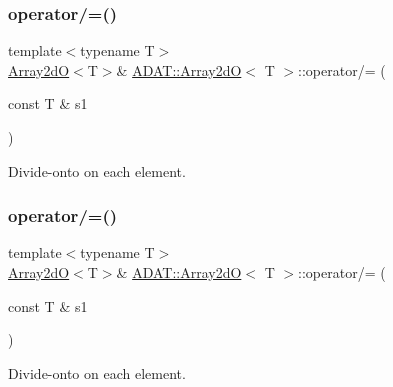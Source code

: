\subsubsection{\texorpdfstring{operator/=()}{operator/=()}\hspace{0.1cm}{\footnotesize\ttfamily [5/6]}}
{\footnotesize\ttfamily template$<$typename T$>$ \\
\mbox{\hyperlink{classADAT_1_1Array2dO}{Array2dO}}$<$T$>$\& \mbox{\hyperlink{classADAT_1_1Array2dO}{A\+D\+A\+T\+::\+Array2dO}}$<$ T $>$\+::operator/= (\begin{DoxyParamCaption}\item[{const T \&}]{s1 }\end{DoxyParamCaption})\hspace{0.3cm}{\ttfamily [inline]}}



Divide-\/onto on each element. 

\mbox{\label{classADAT_1_1Array2dO_ae0c954c51dfb1165b2afdd6152417fcf}} 
\subsubsection{\texorpdfstring{operator/=()}{operator/=()}\hspace{0.1cm}{\footnotesize\ttfamily [6/6]}}
{\footnotesize\ttfamily template$<$typename T$>$ \\
\mbox{\hyperlink{classADAT_1_1Array2dO}{Array2dO}}$<$T$>$\& \mbox{\hyperlink{classADAT_1_1Array2dO}{A\+D\+A\+T\+::\+Array2dO}}$<$ T $>$\+::operator/= (\begin{DoxyParamCaption}\item[{const T \&}]{s1 }\end{DoxyParamCaption})\hspace{0.3cm}{\ttfamily [inline]}}



Divide-\/onto on each element. 

\mbox{\label{classADAT_1_1Array2dO_a258fcfecc226990cc40b36f1edb2f4d5}} 
